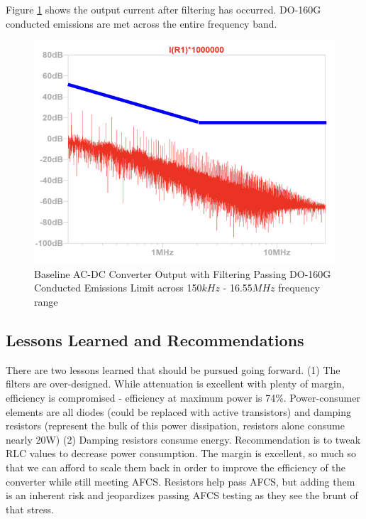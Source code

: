 \documentclass[conference]{IEEEtran}
\begin{document}
Figure \ref{fig:output_filter_emissions_limit_waveform} shows the output current after filtering has occurred. DO-160G conducted emissions are met across the entire frequency band.

\begin{figure}[htp]
    \centering
    \includegraphics[width=1.0\linewidth]{output_filter_emissions_limit.png}
    \caption{Baseline AC-DC Converter Output with Filtering Passing DO-160G Conducted Emissions Limit across 150$kHz$ - 16.55$MHz$ frequency range}
    \label{fig:output_filter_emissions_limit_waveform}
\end{figure}

\subsection{Lessons Learned and Recommendations}
There are two lessons learned that should be pursued going forward. (1) The filters are over-designed. While attenuation is excellent with plenty of margin, efficiency is compromised - efficiency at maximum power is 74\%. Power-consumer elements are all diodes (could be replaced with active transistors) and damping resistors (represent the bulk of this power dissipation, resistors alone consume nearly 20W)
(2) Damping resistors consume energy. Recommendation is to tweak RLC values to decrease power consumption. The margin is excellent, so much so that we can afford to scale them back in order to improve the efficiency of the converter while still meeting AFCS. Resistors help pass AFCS, but adding them is an inherent risk and jeopardizes passing AFCS testing as they see the brunt of that stress.
\end{document}
